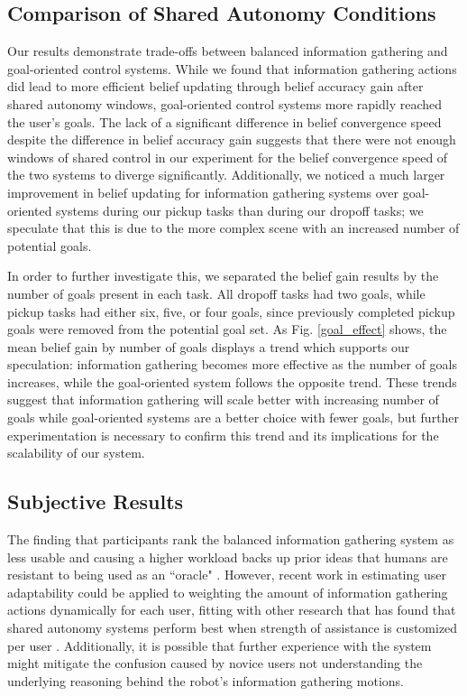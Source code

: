 \documentclass[conference]{IEEEtran}
\begin{document}
\subsection{Comparison of Shared Autonomy Conditions}

Our results demonstrate trade-offs between balanced information gathering and goal-oriented control systems. While we found that information gathering actions did lead to more efficient belief updating through belief accuracy gain after shared autonomy windows, goal-oriented control systems more rapidly reached the user's goals. The lack of a significant difference in belief convergence speed despite the difference in belief accuracy gain suggests that there were not enough windows of shared control in our experiment for the belief convergence speed of the two systems to diverge significantly. Additionally, we noticed a much larger improvement in belief updating for information gathering systems over goal-oriented systems during our pickup tasks than during our dropoff tasks; we speculate that this is due to the more complex scene with an increased number of potential goals. 

In order to further investigate this, we separated the belief gain results by the number of goals present in each task. All dropoff tasks had two goals, while pickup tasks had either six, five, or four goals, since previously completed pickup goals were removed from the potential goal set. As Fig. \ref{goal_effect} shows, the mean belief gain by number of goals displays a trend which supports our speculation: information gathering becomes more effective as the number of goals increases, while the goal-oriented system follows the opposite trend. These trends suggest that information gathering will scale better with increasing number of goals while goal-oriented systems are a better choice with fewer goals, but further experimentation is necessary to confirm this trend and its implications for the scalability of our system.

\subsection{Subjective Results}

The finding that participants rank the balanced information gathering system as less usable and causing a higher workload backs up prior ideas that humans are resistant to being used as an ``oracle" \cite{javdani2015shared}. However, recent work in estimating user adaptability \cite{nikolaidis2017human} could be applied to weighting the amount of information gathering actions dynamically for each user, fitting with other research that has found that shared autonomy systems perform best when strength of assistance is customized per user \cite{gopinath2017human}. Additionally, it is possible that further experience with the system might mitigate the confusion caused by novice users not understanding the underlying reasoning behind the robot's information gathering motions. 
\end{document}
